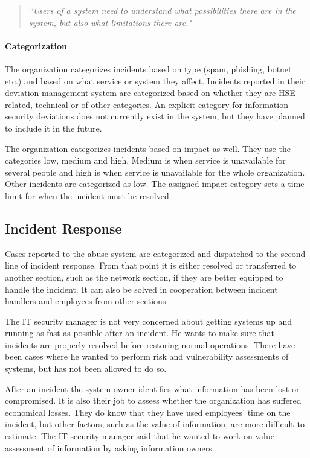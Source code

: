 \documentclass[b5paper, twoside, openright, 11pt]{report}
\begin{document}
\begin{quote}
\textit{``Users of a system need to understand what possibilities there are in the system, but also what limitations there are."} 
\end{quote}

\paragraph{Categorization}
The organization categorizes incidents based on type (spam, phishing, botnet etc.) and based on what service or system they affect. Incidents reported in their deviation management system are categorized based on whether they are \ac{HSE}-related, technical or of other categories. An explicit category for information security deviations does not currently exist in the system, but they have planned to include it in the future.

The organization categorizes incidents based on impact as well. They use the categories low, medium and high. Medium is when service is unavailable for several people and high is when service is unavailable for the whole organization. Other incidents are categorized as low. The assigned impact category sets a time limit for when the incident must be resolved.

\subsection{Incident Response}
Cases reported to the abuse system are categorized and dispatched to the second line of incident response. %
From that point it is either resolved or transferred to another section, such as the network section, if they are better equipped to handle the incident. It can also be solved in cooperation between incident handlers and employees from other sections.

The IT security manager is not very concerned about getting systems up and running as fast as possible after an incident. He wants to make sure that incidents are properly resolved before restoring normal operations. There have been cases where he wanted to perform risk and vulnerability assessments of systems, but has not been allowed to do so.

After an incident the system owner identifies what information has been lost or compromised. It is also their job to assess whether the organization has suffered economical losses. They do know that they have used employees' time on the incident, but other factors, such as the value of information, are more difficult to estimate. The IT security manager said that he wanted to work on value assessment of information by asking information owners.
\end{document}
